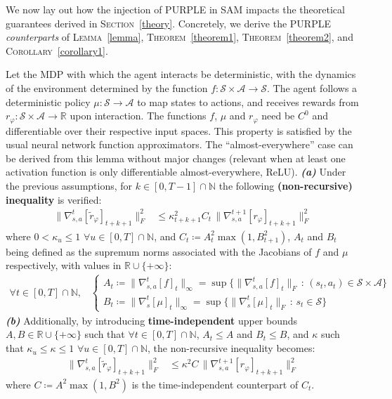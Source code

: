 We now lay out how the injection of PURPLE in SAM impacts the theoretical guarantees derived in
\textsc{Section}~\ref{theory}.
Concretely, we derive the PURPLE \emph{counterparts} of
\textsc{Lemma}~\ref{lemma}, \textsc{Theorem}~\ref{theorem1},
\textsc{Theorem}~\ref{theorem2}, and \textsc{Corollary}~\ref{corollary1}.

\begin{lemma}
\label{lemmapurple}
Let the MDP with which the agent interacts be deterministic,
with the dynamics of the environment determined
by the function $f: \mathcal{S} \times \mathcal{A} \rightarrow \mathcal{S}$.
The agent follows a deterministic policy $\mu: \mathcal{S} \rightarrow \mathcal{A}$
to map states to actions,
and receives rewards from
$r_\varphi: \mathcal{S} \times \mathcal{A} \rightarrow \mathbb{R}$
upon interaction.
The functions $f$, $\mu$ and $r_\varphi$ need be $C^0$ and differentiable
over their respective input spaces.
This property is satisfied by the usual neural network function approximators.
The ``almost-everywhere'' case can be derived from this lemma without major changes
(relevant when at least one activation function is only differentiable almost-everywhere, ReLU).
\textbf{\emph{(a)}} Under the previous assumptions,
for $k \in [0, T-1] \cap \mathbb{N}$ the following \textbf{(non-recursive) inequality} is verified:
\begin{align}
\lVert \nabla_{s,a}^t[\tilde{r}_\varphi]_{t+k+1} \rVert ^2_F
&\leq
\kappa_{t+k+1}^2
C_t
\, \lVert \nabla_{s,a}^{t+1}[r_\varphi]_{t+k+1} \rVert ^2_F
\end{align}
where $0 < \kappa_u \leq 1$ $\forall u \in [0, T] \cap \mathbb{N}$,
and $C_t \coloneqq A_t^2 \max(1, B_{t+1}^2)$,
$A_t$ and $B_t$ being defined as the supremum norms associated with the Jacobians of $f$
and $\mu$ respectively, with values in $\mathbb{R} \cup \{+\infty\}$:
\begin{align}
\forall t \in [0, T] \cap \mathbb{N} \text{,} \quad
\begin{cases}
A_t \coloneqq \lVert\nabla_{s,a}^t[f]_t\rVert _\infty
= \sup \big\{\lVert\nabla_{s,a}^t[f]_t\rVert _F \, : \, (s_t, a_t) \in
\mathcal{S} \times \mathcal{A} \big\} \\
B_t \coloneqq \lVert\nabla_s^t[\mu]_t\rVert _\infty
= \sup \big\{\lVert\nabla_s^t[\mu]_t\rVert _F \, : \, s_t \in
\mathcal{S} \big\}
\end{cases}
\end{align}
\textbf{\emph{(b)}} Additionally, by introducing \textbf{time-independent} upper bounds
$A, B \in \mathbb{R} \cup \{+\infty\}$
such that $\forall t \in [0, T] \cap \mathbb{N}$,
$A_t \leq A$ and $B_t \leq B$,
and $\kappa$ such that $\kappa_u \leq \kappa \leq 1$ $\forall u \in [0, T] \cap \mathbb{N}$,
the non-recursive inequality becomes:
\begin{align}
\lVert \nabla_{s,a}^t[\tilde{r}_\varphi]_{t+k+1} \rVert ^2_F
&\leq
\kappa^2
C
\, \lVert \nabla_{s,a}^{t+1}[r_\varphi]_{t+k+1} \rVert ^2_F
\end{align}
where $C \coloneqq A^2 \max(1, B^2)$ is the time-independent counterpart of $C_t$.
\end{lemma}

